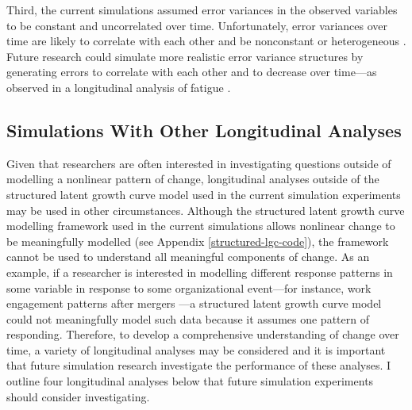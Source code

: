 \documentclass[
12pt, %
twoside,
english]{guelphthesis}
\begin{document}
Third, the current simulations assumed error variances in the observed variables to be constant and uncorrelated over time. Unfortunately, error variances over time are likely to correlate with each other and be nonconstant or heterogeneous \autocite{goldstein1994,deshon1998,bliese2002,braun2013,ding2016,lester2019,blozis2018}. Future research could simulate more realistic error variance structures by generating errors to correlate with each other and to decrease over time---as observed in a longitudinal analysis of fatigue \autocite{lang2018}.

\hypertarget{simulations-with-other-longitudinal-analyses}{%
\subsection{Simulations With Other Longitudinal Analyses}\label{simulations-with-other-longitudinal-analyses}}

Given that researchers are often interested in investigating questions outside of modelling a nonlinear pattern of change, longitudinal analyses outside of the structured latent growth curve model used in the current simulation experiments may be used in other circumstances. Although the structured latent growth curve modelling framework used in the current simulations allows nonlinear change to be meaningfully modelled (see Appendix \ref{structured-lgc-code}), the framework cannot be used to understand all meaningful components of change. As an example, if a researcher is interested in modelling different response patterns in some variable in response to some organizational event---for instance, work engagement patterns after mergers \autocite{seppälä2018}---a structured latent growth curve model could not meaningfully model such data because it assumes one pattern of responding. Therefore, to develop a comprehensive understanding of change over time, a variety of longitudinal analyses may be considered and it is important that future simulation research investigate the performance of these analyses. I outline four longitudinal analyses below that future simulation experiments should consider investigating.
\end{document}

